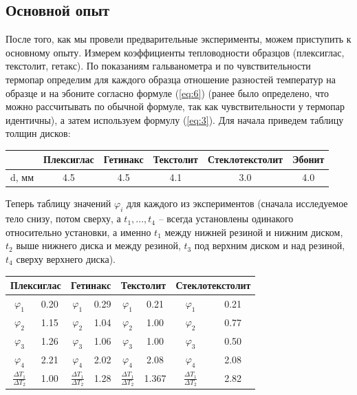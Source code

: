 \documentclass[a4paper,11.5pt]{article} %
\begin{document}
\subsection{Основной опыт}
После того, как мы провели предварительные эксперименты, можем приступить к основному опыту. Измерем коэффициенты тепловодности образцов (плексиглас, текстолит, гетакс). По показаниям гальванометра и по чувствительности термопар определим для каждого образца отношение разностей температур на образце и на эбоните согласно формуле (\ref{eq:6}) (ранее было определено, что можно рассчитывать по обычной формуле, так как чувствительности у термопар идентичны), а затем используем формулу (\ref{eq:3}).
Для начала приведем таблицу толщин дисков:
\begin{center}
\begin{tabular}{|c|c|c|c|c|c|}
\hline 
 & Плексиглас & Гетинакс & Текстолит & Стеклотекстолит & Эбонит \\ 
\hline 
d, мм & 4.5 & 4.5 & 4.1 & 3.0 & 4.0\\ 
\hline 
\end{tabular}
\end{center} 

Теперь таблицу значений $\varphi_i$ для каждого из экспериментов (сначала исследуемое тело снизу, потом сверху, а $t_1, ... , t_4$ -- всегда установлены одинакого относительно установки, а именно $t_1$ между нижней резиной и нижним диском, $t_2$ выше нижнего диска и между резиной, $t_3$ под верхним диском и над резиной, $t_4$ сверху верхнего диска).

\begin{center}
\begin{tabular}{|c|c|c|c|c|c|c|c|}
\hline 
\multicolumn{2}{|c|}{Плексиглас} & \multicolumn{2}{c|}{Гетинакс} & \multicolumn{2}{c|}{Текстолит} & \multicolumn{2}{c|}{Стеклотекстолит} \\ 
\hline 
$\varphi_1$ & 0.20 & $\varphi_1$ & 0.29 & $\varphi_1$ & 0.21 & $\varphi_1$ & 0.21 \\ 
\hline 
$\varphi_2$ & 1.15 & $\varphi_2$ & 1.04 & $\varphi_2$ & 1.00 & $\varphi_2$ & 0.77 \\ 
\hline 
$\varphi_3$ & 1.26 & $\varphi_3$ & 1.06 & $\varphi_3$ & 1.00 & $\varphi_3$ & 0.50 \\ 
\hline 
$\varphi_4$ & 2.21 & $\varphi_4$ & 2.02 & $\varphi_4$ & 2.08 & $\varphi_4$ & 2.08 \\ 
\hline 
$\frac{\Delta T_1}{\Delta T_2}$ & 1.00 & $\frac{\Delta T_1}{\Delta T_2}$ & 1.28 & $\frac{\Delta T_1}{\Delta T_2}$ & 1.367 & $\frac{\Delta T_1}{\Delta T_2}$ & 2.82 \\
\hline
\end{tabular}
\end{center} 
\end{document}
